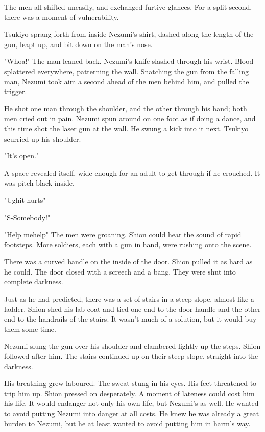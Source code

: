 The men all shifted uneasily, and exchanged furtive glances. For a split
second, there was a moment of vulnerability.

Tsukiyo sprang forth from inside Nezumi's shirt, dashed along the length
of the gun, leapt up, and bit down on the man's nose.

"Whoa!" The man leaned back. Nezumi's knife slashed through his wrist.
Blood splattered everywhere, patterning the wall. Snatching the gun from
the falling man, Nezumi took aim a second ahead of the men behind him,
and pulled the trigger.

He shot one man through the shoulder, and the other through his hand;
both men cried out in pain. Nezumi spun around on one foot as if doing a
dance, and this time shot the laser gun at the wall. He swung a kick
into it next. Tsukiyo scurried up his shoulder.

"It's open."

A space revealed itself, wide enough for an adult to get through if he
crouched. It was pitch-black inside.

"Ugh\el it hurts\el "

"S-Somebody!"

"Help me\el help\el " The men were groaning. Shion could hear the sound
of rapid footsteps. More soldiers, each with a gun in hand, were rushing
onto the scene.

There was a curved handle on the inside of the door. Shion pulled it as
hard as he could. The door closed with a screech and a bang. They were
shut into complete darkness.

Just as he had predicted, there was a set of stairs in a steep slope,
almost like a ladder. Shion shed his lab coat and tied one end to the
door handle and the other end to the handrails of the stairs. It wasn't
much of a solution, but it would buy them some time.

Nezumi slung the gun over his shoulder and clambered lightly up the
steps. Shion followed after him. The stairs continued up on their steep
slope, straight into the darkness.

His breathing grew laboured. The sweat stung in his eyes. His feet
threatened to trip him up. Shion pressed on desperately. A moment of
lateness could cost him his life. It would endanger not only his own
life, but Nezumi's as well. He wanted to avoid putting Nezumi into
danger at all costs. He knew he was already a great burden to Nezumi,
but he at least wanted to avoid putting him in harm's way.

